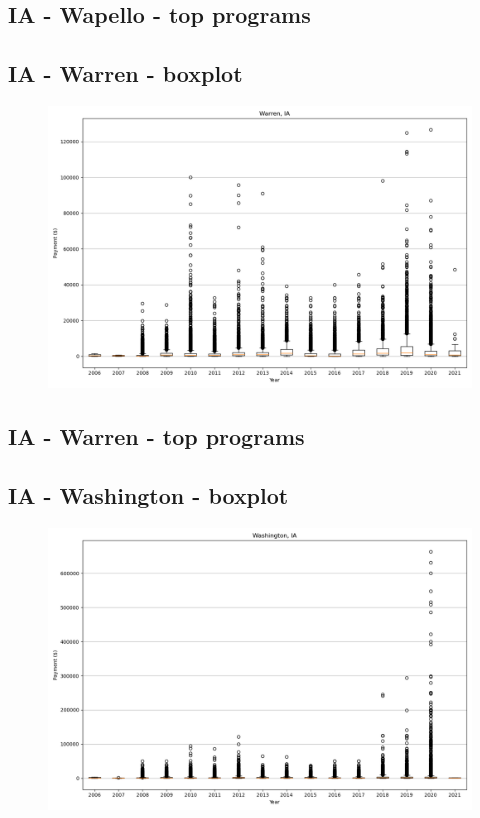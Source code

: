 \subsection*{IA - Wapello - top programs}

\newpage
\subsection*{IA - Warren - boxplot}
\begin{figure}[h]
\centering
\includegraphics[width=7in]{../output/boxplots/counties/Warren-IA_boxplot.png}
\end{figure}


\subsection*{IA - Warren - top programs}

\newpage
\subsection*{IA - Washington - boxplot}
\begin{figure}[h]
\centering
\includegraphics[width=7in]{../output/boxplots/counties/Washington-IA_boxplot.png}
\end{figure}


